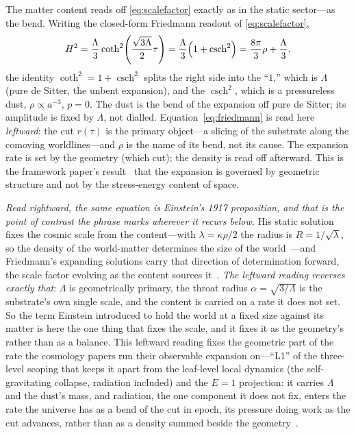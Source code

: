 \documentclass[11pt,a4paper]{article}
\theoremstyle{definition}
\begin{document}
The matter content reads off \eqref{eq:scalefactor} exactly as in the static sector---as the bend. Writing the closed-form Friedmann readout of \eqref{eq:scalefactor},
\begin{equation}\label{eq:friedmann}
H^{2}=\frac{\Lambda}{3}\coth^{2}\!\left(\frac{\sqrt{3\Lambda}}{2}\tau\right)
=\frac{\Lambda}{3}\Bigl(1+\operatorname{csch}^{2}\Bigr)
=\frac{8\pi}{3}\rho+\frac{\Lambda}{3},
\end{equation}
the identity $\coth^{2}=1+\operatorname{csch}^{2}$ splits the right side into the ``$1$,'' which is $\Lambda$ (pure de Sitter, the unbent expansion), and the $\operatorname{csch}^{2}$, which is a pressureless dust, $\rho\propto a^{-3}$, $p=0$. The dust is the bend of the expansion off pure de Sitter; its amplitude is fixed by $\Lambda$, not dialled. Equation~\eqref{eq:friedmann} is read here \emph{leftward}: the cut $r(\tau)$ is the primary object---a slicing of the substrate along the comoving worldlines---and $\rho$ is the name of its bend, not its cause. The expansion rate is set by the geometry (which cut); the density is read off afterward. This is the framework paper's result~\cite{JanzenCRframework} that the expansion is governed by geometric structure and not by the stress-energy content of space.

\emph{Read rightward, the same equation is Einstein's 1917 proposition, and that is the point of contrast the phrase marks wherever it recurs below.} His static solution fixes the cosmic scale from the content---with $\lambda=\kappa\rho/2$ the radius is $R=1/\sqrt{\lambda}$, so the density of the world-matter determines the size of the world~\cite{Einstein1917}---and Friedmann's expanding solutions carry that direction of determination forward, the scale factor evolving as the content sources it~\cite{Friedmann1922}. \emph{The leftward reading reverses exactly that}: $\Lambda$ is geometrically primary, the throat radius $\alpha=\sqrt{3/\Lambda}$ is the substrate's own single scale, and the content is carried on a rate it does not set. So the term Einstein introduced to hold the world at a fixed size against its matter is here the one thing that fixes the scale, and it fixes it as the geometry's rather than as a balance. This leftward reading fixes the geometric part of the rate the cosmology papers run their observable expansion on---``L1'' of the three-level scoping that keeps it apart from the leaf-level local dynamics (the self-gravitating collapse, radiation included) and the $E=1$ projection: it carries $\Lambda$ and the dust's mass, and radiation, the one component it does not fix, enters the rate the universe has as a bend of the cut in epoch, its pressure doing work as the cut advances, rather than as a density summed beside the geometry~\cite{JanzenCosmogenesis,JanzenCRcosmology}.
\end{document}
